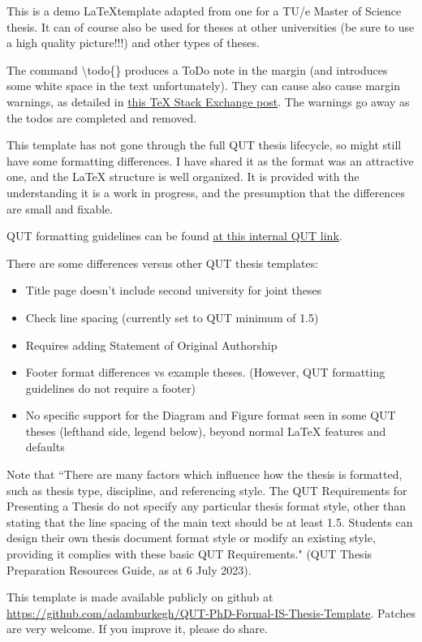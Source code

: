 This is a demo \LaTeX template adapted from one for a TU/e Master of Science thesis. It can of course also be used for theses at other universities (be sure to use a high quality picture!!!) and other types of theses.

The command \textbackslash todo\{\} produces a  ToDo note in the margin (and introduces some white space in the text unfortunately). They can cause also cause margin warnings, as detailed in \href{https://tex.stackexchange.com/questions/23977/what-does-the-warning-about-moved-marginpar-mean}{this TeX Stack Exchange post}. The warnings go away as the todos are completed and removed.


This template has not gone through the full QUT thesis lifecycle, so might still have some formatting differences. I have shared it as the format was an attractive one, and the \LaTeX{} structure is well organized. It is provided with the understanding it is a work in progress, and the presumption that the differences are small and fixable. 

QUT formatting guidelines can be found \href{https://qutvirtual4.qut.edu.au/c/document_library/get_file?uuid=90400693-6c22-4994-bc2b-009c9a100e5f&groupId=16731131&filename=GRC_Presenting-and-Editing_Guidelines.pdf}{at this internal QUT link}.

There are some differences versus other QUT thesis templates:
\begin{itemize}
    \item Title page doesn't include second university for joint theses
    \item Check line spacing (currently set to QUT minimum of 1.5)
    \item Requires adding Statement of Original Authorship
    \item Footer format differences vs example theses. (However, QUT formatting guidelines do not require a footer)
    \item No specific support for the Diagram and Figure format seen in some QUT theses (lefthand side, legend below), beyond normal \LaTeX{} features and defaults
\end{itemize}

Note that ``There are many factors which influence how the thesis is formatted, such as thesis type, discipline, 
and referencing style. The QUT Requirements for Presenting a Thesis do not specify any particular 
thesis format style, other than stating that the line spacing of the main text should be at least 1.5. 
Students can design their own thesis document format style or modify an existing style, providing it 
complies with these basic QUT Requirements." (QUT Thesis Preparation Resources Guide, as at 6 July 2023).

This template is made available publicly on github at \url{https://github.com/adamburkegh/QUT-PhD-Formal-IS-Thesis-Template}. Patches are very welcome. If you improve it, please do share.

